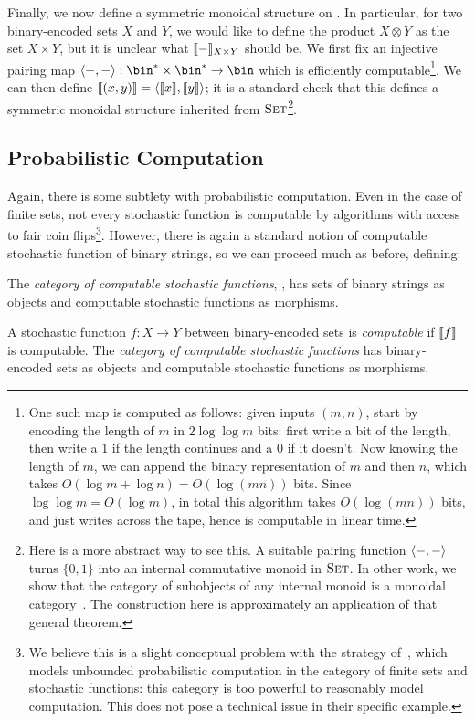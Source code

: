 Finally, we now define a symmetric monoidal structure on .
In particular, for two binary-encoded sets $X$ and $Y$, we would like to define
the product $X\otimes Y$ as the set $X\times Y$, but it is unclear what
$\llbracket - \rrbracket_{X\times Y}$ should be. We first fix an injective pairing map
$\<-,-\>: \bin^*\times\bin^*\to \bin$ which is efficiently computable\footnote{%
  One such map is computed as follows: given inputs $(m,n)$, start by encoding the
  length of $m$ in $2\log\log m$ bits: first write a bit of the length, then
  write a $1$ if the length continues and a $0$ if it doesn't. Now knowing the
  length of $m$, we can append the binary representation of $m$ and then $n$,
  which takes $O(\log m + \log n) = O(\log (mn))$ bits. Since $\log\log m =
  O(\log m)$, in total this algorithm takes $O(\log(mn))$ bits, and just writes
  across the tape, hence is computable in linear time.
}. We can then define $\llbracket (x, y) \rrbracket = \langle\llbracket x \rrbracket, \llbracket y \rrbracket\rangle$; it is a
standard check that this defines a symmetric monoidal structure inherited from
${\textsc{\text{Set}}}$\footnote{
  Here is a more abstract way to see this. A suitable pairing function $\langle-,-\rangle$
  turns $\{0,1\}$ into an internal commutative monoid in ${\textsc{\text{Set}}}$. In other
  work, we show that the category of subobjects of any internal monoid is a
  monoidal category~\cite{shahar-zdancewic-2024}. The construction here is
  approximately an application of that general theorem.
}.

\subsection{Probabilistic Computation}

Again, there is some subtlety with probabilistic computation. Even in the case
of finite sets, not every stochastic function is computable by algorithms with
access to fair coin flips\footnote{
  We believe this is a slight conceptual problem with the strategy
  of~\cite[Section 6]{broadbent-karvonen-2022}, which models unbounded
  probabilistic computation in the category of finite sets and stochastic
  functions: this category is too powerful to reasonably model computation. This
  does not pose a technical issue in their specific example.
}. However, there is again a standard notion of computable stochastic function
of binary strings, so we can proceed much as before, defining:
\begin{dfn}
  The \emph{category of computable stochastic functions}, ,
  has sets of binary strings as objects and computable stochastic functions as
  morphisms.

  A stochastic function $f:X\to Y $ between binary-encoded sets is
  \emph{computable} if $\llbracket f \rrbracket$ is computable. The \emph{category of
  computable stochastic functions}  has binary-encoded sets as
  objects and computable stochastic functions as morphisms.
\end{dfn}

